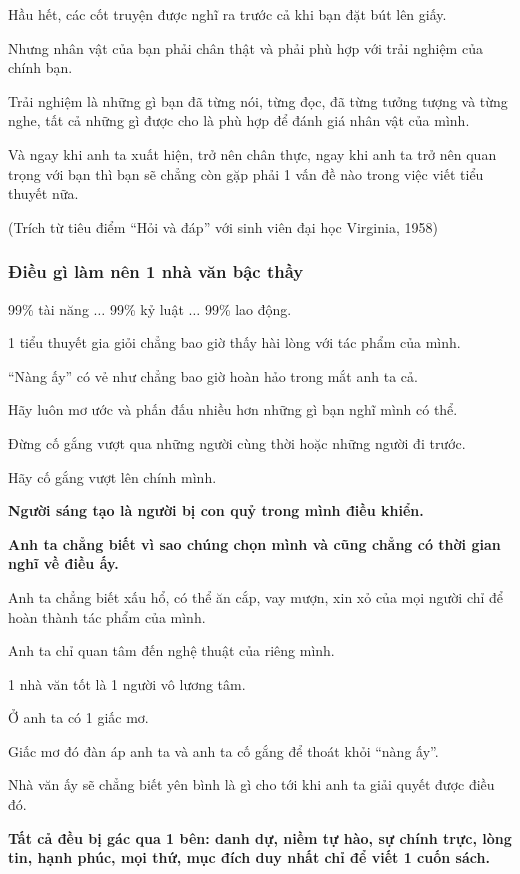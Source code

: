 \documentclass{article}
\begin{document}
Hầu hết, các cốt truyện được nghĩ ra trước cả khi bạn đặt bút lên giấy.

%
Nhưng nhân vật của bạn phải chân thật và phải phù hợp với trải nghiệm của chính bạn.

Trải nghiệm là những gì bạn đã từng nói, từng đọc, đã từng tưởng tượng và từng nghe, tất cả những gì được cho là phù hợp để đánh giá nhân vật của mình.

Và ngay khi anh ta xuất hiện, trở nên chân thực, ngay khi anh ta trở nên quan trọng với bạn thì bạn sẽ chẳng còn gặp phải 1 vấn đề nào trong việc viết tiểu thuyết nữa.

(Trích từ tiêu điểm ``Hỏi và đáp'' với sinh viên đại học Virginia, 1958)

\subsubsection{Điều gì làm nên 1 nhà văn bậc thầy}
99\% tài năng $\ldots$ 99\% kỷ luật $\ldots$ 99\% lao động.

1 tiểu thuyết gia giỏi chẳng bao giờ thấy hài lòng với tác phẩm của mình.

``Nàng ấy'' có vẻ như chẳng bao giờ hoàn hảo trong mắt anh ta cả.

Hãy luôn mơ ước và phấn đấu nhiều hơn những gì bạn nghĩ mình có thể.

Đừng cố gắng vượt qua những người cùng thời hoặc những người đi trước.

Hãy cố gắng vượt lên chính mình.

\textbf{Người sáng tạo là người bị con quỷ trong mình điều khiển.}

\textbf{Anh ta chẳng biết vì sao chúng chọn mình và cũng chẳng có thời gian nghĩ về điều ấy.}

Anh ta chẳng biết xấu hổ, có thể ăn cắp, vay mượn, xin xỏ của mọi người chỉ để hoàn thành tác phẩm của mình.

Anh ta chỉ quan tâm đến nghệ thuật của riêng mình.

1 nhà văn tốt là 1 người vô lương tâm.

Ở anh ta có 1 giấc mơ.

Giấc mơ đó đàn áp anh ta và anh ta cố gắng để thoát khỏi ``nàng ấy''.

Nhà văn ấy sẽ chẳng biết yên bình là gì cho tới khi anh ta giải quyết được điều đó.

\textbf{Tất cả đều bị gác qua 1 bên: danh dự, niềm tự hào, sự chính trực, lòng tin, hạnh phúc, mọi thứ, mục đích duy nhất chỉ để viết 1 cuốn sách.}
\end{document}
